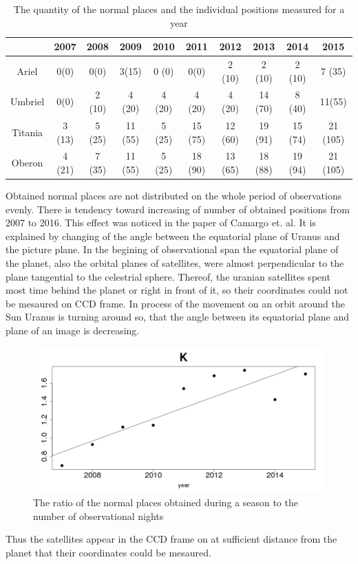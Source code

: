 \documentclass[]{article}
\begin{document}
\begin{table}
\caption{The quantity of the normal places and the individual positions measured for a year}
\label{number_of_points}
\begin{center}
\begin{tabular}{|c|c|c|c|c|c|c|c|c|c|}
\hline
 & 2007 & 2008 & 2009 & 2010 & 2011 & 2012 & 2013 & 2014 & 2015\\
\hline
Ariel & 0(0) & 0(0) & 3(15) & 0 (0) & 0(0) & 2 (10) & 2 (10) & 2 (10) & 7 (35)\\
Umbriel & 0(0) & 2 (10) & 4 (20) & 4 (20) & 4 (20) & 4 (20) & 14 (70) & 8 (40) & 11(55)\\
Titania & 3 (13) & 5 (25) & 11 (55) & 5 (25) & 15 (75) & 12 (60) & 19 (91) & 15 (74) & 21 (105)\\
Oberon & 4 (21) & 7 (35) & 11 (55) & 5 (25) & 18 (90) & 13 (65) & 18 (88) & 19 (94) & 21 (105) \\
\hline
\end{tabular}
\end{center}
\end{table}
Obtained normal places are not distributed on the whole period of observations evenly. There is tendency toward increasing of number of obtained positions from 2007 to 2016. This effect was noticed in the paper of Camargo et. al. \cite{2} It is explained by changing of the angle between the equatorial plane of Uranus and the picture plane. In the begining of observational span the equatorial plane of the planet, also the orbital planes of satellites, were almost perpendicular to the plane tangential to the celestrial sphere. Thereof, the uranian satellites spent most time behind the planet or right in front of it, so their coordinates could not be mesaured on CCD frame. In process of the movement on an orbit around the Sun Uranus is turning around so, that the angle between its equatorial plane and plane of an image is decreasing.
\begin{figure} 
\vspace{-4ex}
\includegraphics[width=\linewidth]{K}
\caption{The ratio of the normal places obtained during a season to the number of observational nights}
\label{fig:K}
\end{figure}
 Thus the satellites appear in the CCD frame on at sufficient distance from the planet that their coordinates could be mesaured.\par
\end{document}
